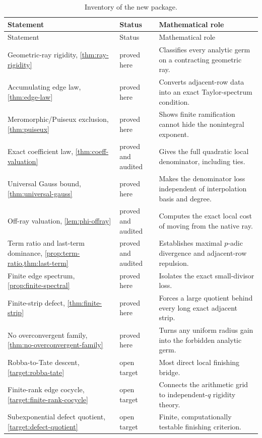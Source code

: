 \documentclass[11pt,oneside]{article}
\theoremstyle{definition}
\begin{document}
\begingroup\small
\begin{longtable}{@{}p{}p{}p{}@{}}
\caption{Inventory of the new package.}\label{tab:inventory}\\
\toprule
Statement & Status & Mathematical role\\
\midrule
\endfirsthead
\toprule
Statement & Status & Mathematical role\\
\midrule
\endhead
Geometric-ray rigidity, \cref{thm:ray-rigidity} & proved here & Classifies every analytic germ on a contracting geometric ray.\\
Accumulating edge law, \cref{thm:edge-law} & proved here & Converts adjacent-row data into an exact Taylor-spectrum condition.\\
Meromorphic/Puiseux exclusion, \cref{thm:puiseux} & proved here & Shows finite ramification cannot hide the nonintegral exponent.\\
Exact coefficient law, \cref{thm:coeff-valuation} & proved and audited & Gives the full quadratic local denominator, including ties.\\
Universal Gauss bound, \cref{thm:universal-gauss} & proved here & Makes the denominator loss independent of interpolation basis and degree.\\
Off-ray valuation, \cref{lem:phi-offray} & proved and audited & Computes the exact local cost of moving from the native ray.\\
Term ratio and last-term dominance, \cref{prop:term-ratio,thm:last-term} & proved and audited & Establishes maximal $p$-adic divergence and adjacent-row repulsion.\\
Finite edge spectrum, \cref{prop:finite-spectral} & proved here & Isolates the exact small-divisor loss.\\
Finite-strip defect, \cref{thm:finite-strip} & proved here & Forces a large quotient behind every long exact adjacent strip.\\
No overconvergent family, \cref{thm:no-overconvergent-family} & proved here & Turns any uniform radius gain into the forbidden analytic germ.\\
Robba-to-Tate descent, \cref{target:robba-tate} & open target & Most direct local finishing bridge.\\
Finite-rank edge cocycle, \cref{target:finite-rank-cocycle} & open target & Connects the arithmetic grid to independent-$q$ rigidity theory.\\
Subexponential defect quotient, \cref{target:defect-quotient} & open target & Finite, computationally testable finishing criterion.\\
\bottomrule
\end{longtable}
\endgroup
\end{document}
